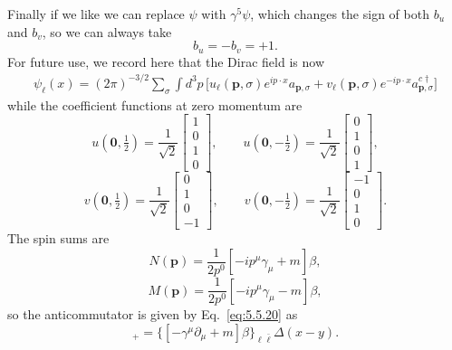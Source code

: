 Finally if we like we can replace $\psi$ with $\gamma^5\psi$, which changes the
sign of both $b_u$ and $b_v$, so we can always take
\begin{equation}
b_u=-b_v=+1.
\tag{5.5.33}\label{eq:5.5.33}
\end{equation}
For future use, we record here that the Dirac field is now
\begin{align}
\psi_\ell(x)=(2\pi)^{-3/2}\sum_\sigma\int d^3p\,
\bigl[u_\ell(\mathbf p,\sigma)e^{ip\cdot x}a_{\mathbf p,\sigma}
+v_\ell(\mathbf p,\sigma)e^{-ip\cdot x}a^{c\dagger}_{\mathbf p,\sigma}\bigr]
\tag{5.5.34}\label{eq:5.5.34}
\end{align}
while the coefficient functions at zero momentum are
\begin{equation}
u(\mathbf0,\tfrac12)=\frac1{\sqrt2}\begin{bmatrix}1\\0\\1\\0\end{bmatrix},
\qquad
u(\mathbf0,-\tfrac12)=\frac1{\sqrt2}\begin{bmatrix}0\\1\\0\\1\end{bmatrix},
\tag{5.5.35}\label{eq:5.5.35}
\end{equation}
\begin{equation}
v(\mathbf0,\tfrac12)=\frac1{\sqrt2}\begin{bmatrix}0\\1\\0\\-1\end{bmatrix},
\qquad
v(\mathbf0,-\tfrac12)=\frac1{\sqrt2}\begin{bmatrix}-1\\0\\1\\0\end{bmatrix}.
\tag{5.5.36}\label{eq:5.5.36}
\end{equation}
The spin sums are
\begin{equation}
N(\mathbf p)=\frac1{2p^0}[-ip^\mu\gamma_\mu+m]\beta,
\tag{5.5.37}\label{eq:5.5.37}
\end{equation}
\begin{equation}
M(\mathbf p)=\frac1{2p^0}[-ip^\mu\gamma_\mu-m]\beta,
\tag{5.5.38}\label{eq:5.5.38}
\end{equation}
so the anticommutator is given by Eq.~\eqref{eq:5.5.20} as
\begin{equation}
[\psi_\ell(x),\psi_{\bar\ell}^\dagger(y)]_+
=\{[-\gamma^\mu\partial_\mu+m]\beta\}_{\ell\bar\ell}\Delta(x-y).
\tag{5.5.39}\label{eq:5.5.39}
\end{equation}

